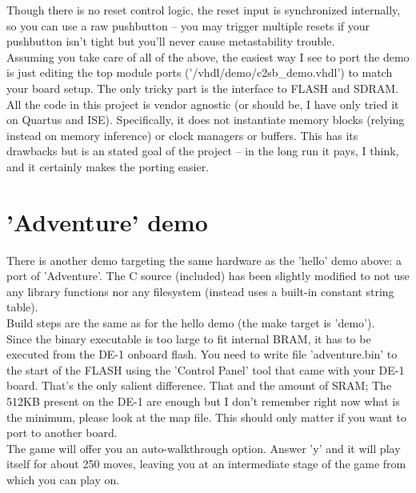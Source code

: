     Though there is no reset control logic, the reset input is synchronized 
    internally, so you can use a raw pushbutton -- you may trigger multiple 
    resets if your pushbutton isn't tight but you'll never cause metastability 
    trouble.\\

    Assuming you take care of all of the above, the easiest way I see to port
    the demo is just editing the top module ports ('/vhdl/demo/c2sb\_demo.vhdl')
    to match your board setup. The only tricky part is the interface to FLASH 
    and SDRAM.\\

    All the code in this project is vendor agnostic (or should be, I have only
    tried it on Quartus and ISE). Specifically, it does not instantiate memory
    blocks (relying instead on memory inference) or clock managers or buffers.
    This has its drawbacks but is an stated goal of the project -- in the long
    run it pays, I think, and it certainly makes the porting easier.\\
    
\section{'Adventure' demo}
\label{adventure}

    There is another demo targeting the same hardware as the 'hello' demo above:
    a port of 'Adventure'. The C source (included) has been slightly modified
    to not use any library functions nor any filesystem (instead uses a built-in
    constant string table).\\
    
    Build steps are the same as for the hello demo (the make target is 'demo').\\
    
    Since the binary executable is too large to fit internal BRAM, it has to be 
    executed from the DE-1 onboard flash. You need to write file 'adventure.bin'
    to the start of the FLASH using the 'Control Panel' tool that came with your
    DE-1 board. That's the only salient difference. That and the amount of SRAM;
    The 512KB present on the DE-1 are enough but I don't remember right now
    what is the minimum, please look at the map file. This should only matter
    if you want to port to another board.\\
    
    The game will offer you an auto-walkthrough option. Answer 'y' and it will
    play itself for about 250 moves, leaving you at an intermediate stage of 
    the game from which you can play on.\\
    

